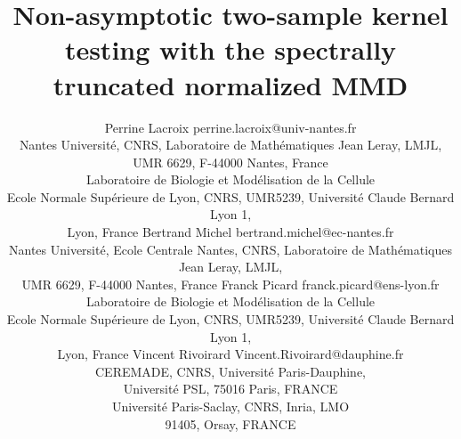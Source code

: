 \documentclass[twoside,11pt]{article}
\begin{document}
\title{Non-asymptotic two-sample kernel testing with the spectrally truncated normalized MMD}

\author{\name Perrine Lacroix \email perrine.lacroix@univ-nantes.fr \\
       \addr Nantes Université, CNRS, Laboratoire de Mathématiques Jean Leray, LMJL, \\
        UMR 6629, F-44000 Nantes, France \\
       \addr Laboratoire de Biologie et Modélisation de la Cellule \\
       Ecole Normale Supérieure de Lyon, CNRS, UMR5239, Université Claude Bernard Lyon 1, \\
       Lyon, France 
       \AND
       \name Bertrand Michel \email bertrand.michel@ec-nantes.fr \\
       \addr  Nantes Université, Ecole Centrale Nantes, CNRS, Laboratoire de Mathématiques Jean Leray, LMJL, \\
	UMR 6629, F-44000 Nantes, France
       \AND
       \name Franck Picard \email franck.picard@ens-lyon.fr \\
       \addr Laboratoire de Biologie et Modélisation de la Cellule \\
       Ecole Normale Supérieure de Lyon, CNRS, UMR5239, Université Claude Bernard Lyon 1, \\
       Lyon, France
       \AND
       \name Vincent Rivoirard  \email Vincent.Rivoirard@dauphine.fr \\
       \addr CEREMADE, CNRS, Universit\'e Paris-Dauphine,\\
        Universit\'e PSL, 75016 Paris, FRANCE\\
       \addr Universit\'e Paris-Saclay, CNRS, Inria, LMO\\ 
        91405, Orsay, FRANCE
       }
       



\maketitle
\end{document}
